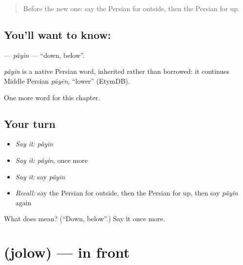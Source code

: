 \label{lesson:FA-C68-payin}



\begin{quote}
Before the new one: say the Persian for outside, then the Persian for up.
\end{quote}

\subsection*{You'll want to know: }
\textbf{} — \emph{pâyin} — \textquotedblleft{}down, below\textquotedblright{}.

\begin{cousinweb}
\emph{pâyin} is a native Persian word, inherited rather than borrowed: it continues Middle Persian \emph{pāyēn}, \textquotedblleft{}lower\textquotedblright{} (EtymDB).
\end{cousinweb}

\begin{grammarlens}[title={What you've built}]
One more word for this chapter.
\end{grammarlens}

\subsection*{Your turn}
\begin{itemize}
\raggedright
  \item \emph{Say it:} \emph{pâyin}
  \item \emph{Say it:} \emph{pâyin}, once more
  \item \emph{Say it:} say \emph{pâyin}
  \item \emph{Recall:} say the Persian for outside, then the Persian for up, then say \emph{pâyin} again
\end{itemize}

\begin{tcolorbox}[breakable,colback=teal!4,colframe=teal!35!black,title={Before you move on}]
What does  mean? (\textquotedblleft{}Down, below\textquotedblright{}.) Say it once more.
\end{tcolorbox}
\section[\texorpdfstring{\fa{جلو} (jolow)}{جلو (jolow)}]{ (jolow) — in front}

\label{lesson:FA-C68-jolow}



